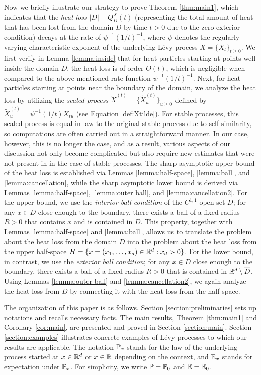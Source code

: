 \documentclass[11pt]{article}
\begin{document}
\begin{doublespace}
Now we briefly illustrate our strategy to prove Theorem \ref{thm:main1}, which indicates that the \textit{heat loss} $|D|-Q_{D}^{X}(t)$ 
(representing the total amount of heat that has been lost from the domain $D$ by time $t>0$ due to the zero exterior condition) decays at the rate of $\psi^{-1}(1/t)^{-1}$, where $\psi$ denotes the regularly varying characteristic exponent of the underlying L\'evy process $X=\{X_t\}_{t\ge 0}$. 
We first verify in Lemma \ref{lemma:inside} that for heat particles starting at points well inside the domain $D$, the heat loss is of order $O(t)$, which is negligible when compared to the above-mentioned rate function $\psi^{-1}(1/t)^{-1}$.  
Next, for heat particles starting at points near the boundary of the domain, we analyze the heat loss by utilizing the \textit{scaled process} $\widetilde{X}^{(t)}=\{\widetilde{X}^{(t)}_u\}_{u\ge 0}$ defined by $\widetilde{X}_{u}^{(t)}=\psi^{-1}(1/t)X_{tu}$ (see Equation \eqref{def:Xtilde}).
For stable processes, this scaled process is equal in law to the original stable process due to self-similarity, so computations are often carried out in a straightforward manner. In our case, however, this is no longer the case, and as a result, various aspects of our discussion not only become complicated but also require new estimates that were not present in \cite{PS22} in the case of stable processes. 
The sharp asymptotic upper bound of the heat loss is established via Lemmas \ref{lemma:half-space}, \ref{lemma:ball}, and \ref{lemma:cancellation}, while the sharp asymptotic lower bound is derived via Lemmas \ref{lemma:half-space}, \ref{lemma:outer ball}, and \ref{lemma:cancellation2}. 
For the upper bound, we use the \textit{interior ball condition} of the $C^{1,1}$ open set $D$; for any $x\in D$ close enough to the boundary, there exists a ball of a fixed radius $R>0$ that contains $x$ and is contained in $D$. 
This property, together with Lemmas \ref{lemma:half-space} and \ref{lemma:ball}, allows us to translate the problem about the heat loss from the domain $D$ into the problem about the heat loss from the upper half-space $H=\{x=(x_1,\ldots, x_d)\in \R^{d}: x_{d}>0\}$.
For the lower bound, in contrast, we use the \textit{exterior ball condition}; for any $x\in D$ close enough to the boundary, there exists a ball of a fixed radius $R>0$ that is contained in $\R^d\setminus\overline{D}$.
Using Lemmas \ref{lemma:outer ball} and \ref{lemma:cancellation2}, we again analyze the heat loss from $D$ by connecting it with the heat loss from the half-space. 

The organization of this paper is as follows. Section \ref{section:preliminaries} sets up notations and recalls necessary facts. The main results, Theorem \ref{thm:main1} and Corollary \ref{cor:main}, are presented and proved in Section \ref{section:main}. Section \ref{section:examples} illustrates concrete examples of L\'evy processes to which our results are applicable.  
The notation $\P_x$ stands for the law of the underlying process started at $x \in \R^{d}$ or $x \in \R$ depending on the context, and $\E_x$ stands for expectation under $\P_x$.
For simplicity, we write $\P = \P_0$ and $\E = \E_0$.
  


\end{doublespace}
\end{document}

